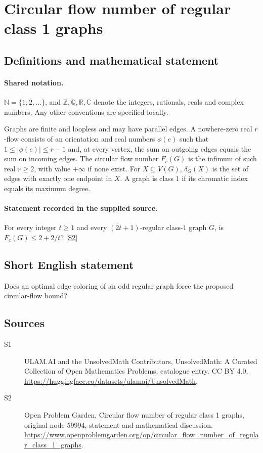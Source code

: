 \documentclass[11pt]{article}
\newcommand{\sref}[2]{\hyperlink{source:#1:#2}{[S#2]}}
\begin{document}
\section{Circular flow number of regular class 1 graphs}\label{statement}

\subsection{Definitions and mathematical statement}

\paragraph{Shared notation.}$\mathbb N=\{1,2,\ldots\}$, and $\mathbb Z,\mathbb Q,\mathbb R,\mathbb C$ denote the integers, rationals, reals and complex numbers. Any other conventions are specified locally.


Graphs are finite and loopless and may have parallel edges. A nowhere-zero real $r$-flow consists of an orientation and real numbers $\phi(e)$ such that $1\le|\phi(e)|\le r-1$ and, at every vertex, the sum on outgoing edges equals the sum on incoming edges. The circular flow number $F_c(G)$ is the infimum of such real $r\ge2$, with value $+\infty$ if none exist. For $X\subseteq V(G)$, $\delta_G(X)$ is the set of edges with exactly one endpoint in $X$. A graph is class $1$ if its chromatic index equals its maximum degree.
\paragraph{Statement recorded in the supplied source.}
For every integer $t\ge1$ and every $(2t+1)$-regular class-$1$ graph $G$, is $F_c(G)\le2+2/t$? \sref{statement}{2}
\subsection{Short English statement}
Does an optimal edge coloring of an odd regular graph force the proposed circular-flow bound?
\subsection{Sources}
\begin{description}
\item[\hypertarget{source:statement:1}{S1}] ULAM.AI and the UnsolvedMath Contributors, UnsolvedMath: A Curated Collection of Open Mathematics Problems, catalogue entry. CC BY 4.0. \url{https://huggingface.co/datasets/ulamai/UnsolvedMath}.
\item[\hypertarget{source:statement:2}{S2}] Open Problem Garden, Circular flow number of regular class 1 graphs, original node 59994, statement and mathematical discussion. \url{https://www.openproblemgarden.org/op/circular_flow_number_of_regular_class_1_graphs}.
\end{description}
\label{end:statement}
\end{document}
